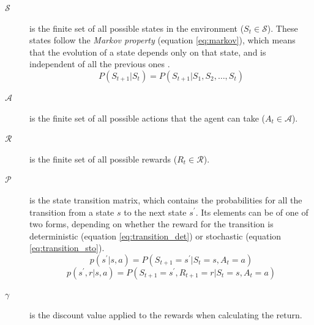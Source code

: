 \begin{description}
    \item[$\mathcal{S}$] is the finite set of all possible states in the environment ($S_t \in \mathcal{S}$). These states follow the \textit{Markov property} (equation \ref{eq:markov}), which means that the evolution of a state depends only on that state, and is independent of all the previous ones \cite{Sutton:2018}.
    \begin{equation}
    \label{eq:markov}
        P(S_{t+1}|S_t) = P(S_{t+1}|S_1, S_2, \ldots, S_t)
    \end{equation}
    \item[$\mathcal{A}$] is the finite set of all possible actions that the agent can take ($A_t \in \mathcal{A}$).
    \item[$\mathcal{R}$] is the finite set of all possible rewards ($R_t \in \mathcal{R}$). 
    \item[$\mathcal{P}$] is the state transition matrix, which contains the probabilities for all the transition from a state $s$ to the next state $s^\prime$. Its elements can be of one of two forms, depending on whether the reward for the transition is deterministic (equation \ref{eq:transition_det}) or stochastic (equation \ref{eq:transition_sto}).
    \begin{equation}
    \label{eq:transition_det}
        p(s^\prime|s, a) = P(S_{t+1} = s^\prime|S_t = s, A_t = a)
    \end{equation}
    \begin{equation}
    \label{eq:transition_sto}
        p(s^\prime, r|s, a) = P(S_{t+1} = s^\prime, R_{t+1} = r|S_t = s, A_t = a)
    \end{equation}
    \item[$\gamma$] is the discount value applied to the rewards when calculating the return.
\end{description}



